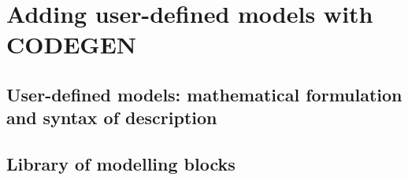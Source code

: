 \documentclass{sps-report}
\begin{document}





















\part{Adding user-defined models with CODEGEN}

\chapter[User-defined models]{User-defined models: mathematical formulation and syntax of description}\label{ch-user_models}


\chapter{Library of modelling blocks}\label{ch-libray_blocks}






































\end{document}

